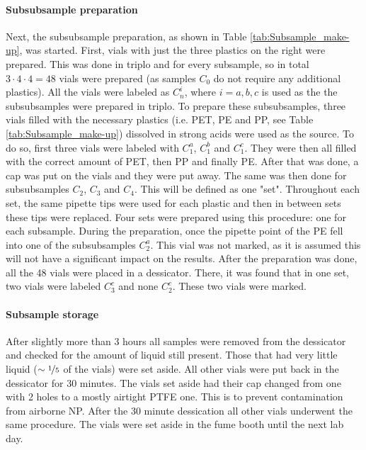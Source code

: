 \documentclass[twocolumn,a4paper,aps,amsmath,amssymb,floatfix,superscriptaddress]{revtex4-2}
\begin{document}
	\paragraph*{Subsubsample preparation}
	Next, the subsubsample preparation, as shown in Table \ref{tab:Subsample_make-up}, was started. First, vials with just the three plastics on the right were prepared. This was done in triplo and for every subsample, so in total $3 \cdot 4 \cdot 4 = 48$ vials were prepared (as samples $C_0$ do not require any additional plastics). All the vials were labeled as $C_n^i$, where $i = a,b,c$ is used as the the subsubsamples were prepared in triplo. 
	To prepare these subsubsamples, three vials filled with the necessary plastics (i.e. PET, PE and PP, see Table \ref{tab:Subsample_make-up}) dissolved in strong acids were used as the source. To do so, first three vials were labeled with $C_1^a$, $C_1^b$ and $C_1^c$. They were then all filled with the correct amount of PET, then PP and finally PE. After that was done, a cap was put on the vials and they were put away. The same was then done for subsubsamples $C_2$, $C_3$ and $C_4$. This will be defined as one "set". Throughout each set, the same pipette tips were used for each plastic and then in between sets these tips were replaced. Four sets were prepared using this procedure: one for each subsample. During the preparation, once the pipette point of the PE fell into one of the subsubsamples $C_2^a$. This vial was not marked, as it is assumed this will not have a significant impact on the results. 
	After the preparation was done, all the 48 vials were placed in a dessicator. There, it was found that in one set, two vials were labeled $C_3^c$ and none $C_2^c$. These two vials were marked.
	\paragraph*{Subsample storage}
	After slightly more than 3 hours all samples were removed from the dessicator and checked for the amount of liquid still present. Those that had very little liquid ($\sim\nicefrac{1}{5}$ of the vials) were set aside. All other vials were put back in the dessicator for 30 minutes. The vials set aside had their cap changed from one with 2 holes to a mostly airtight PTFE one. This is to prevent contamination from airborne NP. After the 30 minute dessication all other vials underwent the same procedure. The vials were set aside in the fume booth until the next lab day. 
	
\end{document}
